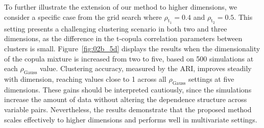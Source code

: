 \documentclass[
  12pt]{article}
\newcommand{\rhou}[1]{\rho_{\text{#1}}}
\begin{document}
To further illustrate the extension of our method to higher dimensions, we consider a specific case from the grid search where $\rho_{\text{t}_1} = 0.4$ and $\rho_{\text{t}_2} = 0.5$. 
This setting presents a challenging clustering scenario in both two and three dimensions, as the difference in the t-copula correlation parameters between clusters is small. 
Figure~\ref{fig:02b_5d} displays the results when the dimensionality of the copula mixture is increased from two to five, based on 500 simulations at each $\rhou{Gauss}$ value. 
Clustering accuracy, measured by the ARI, improves steadily with dimension, reaching values close to 1 across all $\rhou{Gauss}$ settings at five dimensions. 
These gains should be interpreted cautiously, since the simulations increase the amount of data without altering the dependence structure across variable pairs. 
Nevertheless, the results demonstrate that the proposed method scales effectively to higher dimensions and performs well in multivariate settings. 
\end{document}
